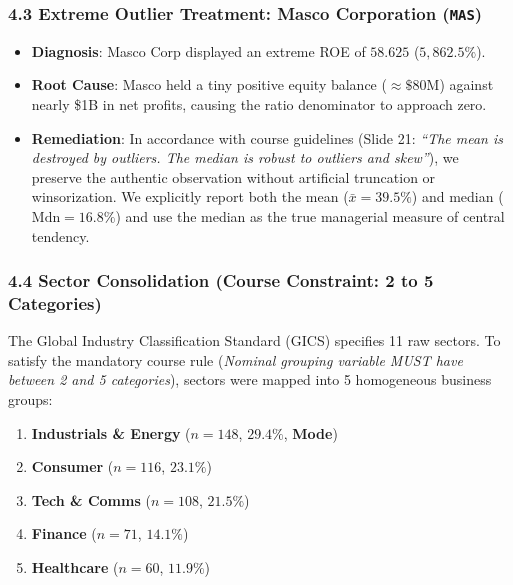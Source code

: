 \documentclass[
]{article}
\providecommand{\tightlist}{%
  \setlength{\itemsep}{0pt}\setlength{\parskip}{0pt}}
\begin{document}
\subsubsection{\texorpdfstring{4.3 Extreme Outlier Treatment: Masco
Corporation
(\texttt{MAS})}{4.3 Extreme Outlier Treatment: Masco Corporation (MAS)}}\label{extreme-outlier-treatment-masco-corporation-mas}

\begin{itemize}
\tightlist
\item
  \textbf{Diagnosis}: Masco Corp displayed an extreme ROE of \(58.625\)
  (\(5,862.5\%\)).
\item
  \textbf{Root Cause}: Masco held a tiny positive equity balance
  (\(\approx \$80\text{M}\)) against nearly \$1B in net profits, causing
  the ratio denominator to approach zero.
\item
  \textbf{Remediation}: In accordance with course guidelines (Slide 21:
  \emph{``The mean is destroyed by outliers. The median is robust to
  outliers and skew''}), we preserve the authentic observation without
  artificial truncation or winsorization. We explicitly report both the
  mean (\(\bar{x} = 39.5\%\)) and median (\(\text{Mdn} = 16.8\%\)) and
  use the median as the true managerial measure of central tendency.
\end{itemize}

\subsubsection{4.4 Sector Consolidation (Course Constraint: 2 to 5
Categories)}\label{sector-consolidation-course-constraint-2-to-5-categories}

The Global Industry Classification Standard (GICS) specifies 11 raw
sectors. To satisfy the mandatory course rule (\emph{Nominal grouping
variable MUST have between 2 and 5 categories}), sectors were mapped
into 5 homogeneous business groups:

\begin{enumerate}
\def\labelenumi{\arabic{enumi}.}
\tightlist
\item
  \textbf{Industrials \& Energy} (\(n = 148\), \(29.4\%\),
  \textbf{Mode})
\item
  \textbf{Consumer} (\(n = 116\), \(23.1\%\))
\item
  \textbf{Tech \& Comms} (\(n = 108\), \(21.5\%\))
\item
  \textbf{Finance} (\(n = 71\), \(14.1\%\))
\item
  \textbf{Healthcare} (\(n = 60\), \(11.9\%\))
\end{enumerate}
\end{document}

